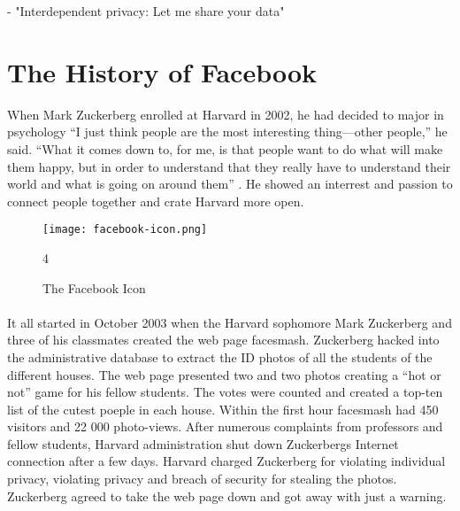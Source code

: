 - "Interdependent privacy: Let me share your data"
\paragraph{}





\section{The History of Facebook}
When Mark Zuckerberg enrolled at Harvard in 2002, he had decided to major in psychology  “I just think people are the most interesting thing—other people,” he said. “What it comes down to, for me, is that people want to do what will make them happy, but in order to understand that they really have to understand their world and what is going on around them” \cite{MeMedia}. He showed an interrest and passion to connect people together and crate Harvard more open. 

\begin{figure}[h!]
\centering
\texttt{[image: facebook-icon.png]}
\caption{The Facebook Icon}4
\end{figure}

\paragraph{}
It all started in October 2003 when the Harvard sophomore Mark Zuckerberg and three of his classmates created the web page facesmash. Zuckerberg hacked into the administrative database to extract the ID photos of all the students of the different houses. The web page presented two and two photos creating a “hot or not” game for his fellow students. The votes were counted and created a top-ten list of the cutest poeple in each house. Within the first hour facesmash had 450 visitors and 22 000 photo-views. After numerous complaints from professors and fellow students, Harvard administration shut down Zuckerbergs Internet connection after a few days. Harvard charged Zuckerberg for violating individual privacy, violating privacy and breach of security for stealing the photos. Zuckerberg agreed to take the web page down and got away with just a warning.

